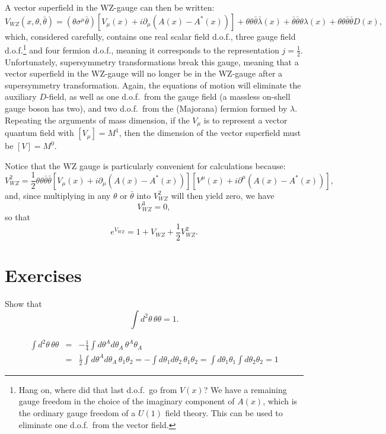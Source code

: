 \documentclass[notes.tex]{subfiles}
\begin{document}
A vector superfield in the WZ-gauge can then be written:
\begin{equation}
V_{WZ} (x, \theta, \bar{\theta}) = (\theta\sigma^\mu \bar{\theta})[V_\mu(x) + i\partial_\mu(A(x) - A^*(x))] + \theta\theta\bar{\theta}\bar{\lambda}(x) + \bar{\theta}\bar{\theta}\theta\lambda (x) + \theta\theta\bar{\theta}\bar{\theta}D(x),
\label{eq:vectorsuperfieldWZ}
\end{equation}
which, considered carefully, contains one real scalar field d.o.f., three gauge field d.o.f.\footnote{Hang on, where did that last d.o.f.\ go from $V(x)$? We have a remaining gauge freedom in the choice of the imaginary component of $A(x)$, which is the ordinary gauge freedom of a $U(1)$ field theory. This can be used to eliminate one d.o.f.\ from the vector field.} and four fermion d.o.f., meaning it corresponds to the representation $j=\frac{1}{2}$. Unfortunately, supersymmetry transformations break this gauge, meaning that a vector superfield in the WZ-gauge will no longer be in the WZ-gauge after a supersymmetry transformation. 
Again, the equations of motion will eliminate the auxiliary $D$-field, as well as one d.o.f.\ from the gauge field (a massless on-shell gauge boson has two), and two d.o.f.\ from the (Majorana) fermion formed by $\lambda$.
Repeating the arguments of mass dimension, if the $V_\mu$ is to represent a vector quantum field with $[V_\mu]=M^1$, then the dimension of the vector superfield must be $[V]=M^0$.

Notice that the WZ gauge is particularly convenient for calculations because:
\begin{equation}
V_{WZ}^2 = \frac{1}{2}\theta\theta\bar{\theta}\bar{\theta}[V_\mu(x) + i\partial_\mu(A(x) - A^*(x))][V^\mu(x) + i\partial^\mu(A(x) - A^*(x))],
\label{eq:V2_WZ}
\end{equation}
and, since multiplying in any $\theta$ or $\bar\theta$ into $V_{WZ}^2$ will then yield zero, we have 
\[V_{WZ}^3 = 0,\]
so that 
\[e^{V_{WZ}} = 1 + V_{WZ} + \frac{1}{2}V_{WZ}^2.\]



\section{Exercises}
\noindent

\begin{Exercise}
Show that
\[\int d^2\theta\,\theta\theta = 1.\]
\end{Exercise}

\begin{Answer}
\begin{eqnarray*}
\int d^2\theta\,\theta\theta &=& - \frac{1}{4} \int d\theta^Ad\theta_A\,\theta^A\theta_A \\
&=& \frac{1}{2} \int d\theta^Ad\theta_A\,\theta_1\theta_2
= - \int d\theta_1d\theta_2\,\theta_1\theta_2=\int d\theta_1\theta_1\int d\theta_2\theta_2=1
\end{eqnarray*}
\end{Answer}
\end{document}
